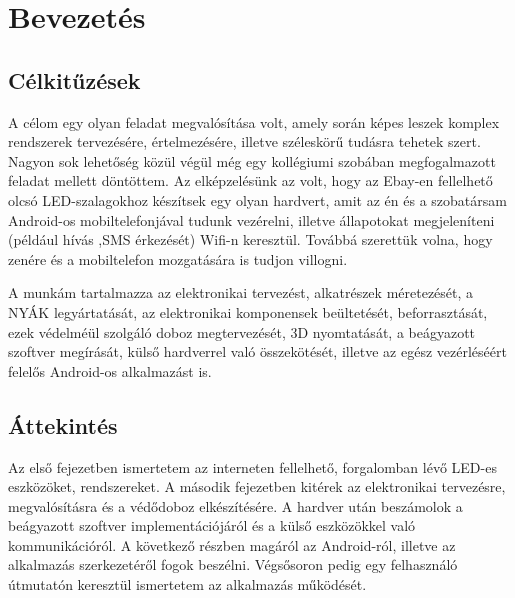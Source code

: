 \documentclass[../main.tex]{subfiles}
\begin{document}
\section{Bevezetés}
    \subsection{Célkitűzések}
        A célom egy olyan feladat megvalósítása volt, amely során képes leszek komplex rendszerek tervezésére, értelmezésére, illetve széleskörű tudásra tehetek szert. Nagyon sok lehetőség közül végül még egy kollégiumi szobában megfogalmazott feladat mellett döntöttem. 
        Az elképzelésünk az volt, hogy az Ebay-en fellelhető olcsó LED-szalagokhoz készítsek egy olyan hardvert, amit az én és a szobatársam Android-os mobiltelefonjával tudunk vezérelni, illetve állapotokat megjeleníteni (például hívás ,SMS érkezését) Wifi-n keresztül. Továbbá szerettük volna, hogy zenére és a mobiltelefon mozgatására is tudjon villogni. 
        
        A munkám tartalmazza az elektronikai tervezést, alkatrészek méretezését, a NYÁK legyártatását, az elektronikai komponensek beültetését, beforrasztását, ezek védelméül szolgáló doboz megtervezését, 3D nyomtatását, a beágyazott szoftver megírását, külső hardverrel való összekötését, illetve az egész vezérléséért felelős Android-os alkalmazást is. 
    \subsection{Áttekintés}
        Az első fejezetben ismertetem az interneten fellelhető, forgalomban lévő LED-es eszközöket, rendszereket.
        A második fejezetben kitérek az elektronikai tervezésre, megvalósításra és a védődoboz elkészítésére.
        A hardver után beszámolok a beágyazott szoftver implementációjáról és a külső eszközökkel való kommunikációról.
        A következő részben magáról az Android-ról, illetve az alkalmazás szerkezetéről fogok beszélni. Végsősoron pedig egy felhasználó útmutatón keresztül ismertetem az alkalmazás működését.
\end{document}
